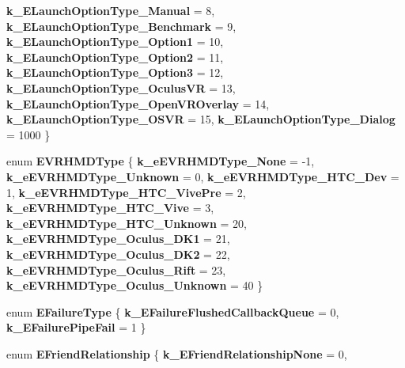 \begin{DoxyCompactItemize}
{\bfseries k\+\_\+\+E\+Launch\+Option\+Type\+\_\+\+Manual} = 8, 
{\bfseries k\+\_\+\+E\+Launch\+Option\+Type\+\_\+\+Benchmark} = 9, 
{\bfseries k\+\_\+\+E\+Launch\+Option\+Type\+\_\+\+Option1} = 10, 
{\bfseries k\+\_\+\+E\+Launch\+Option\+Type\+\_\+\+Option2} = 11, 
\newline
{\bfseries k\+\_\+\+E\+Launch\+Option\+Type\+\_\+\+Option3} = 12, 
{\bfseries k\+\_\+\+E\+Launch\+Option\+Type\+\_\+\+Oculus\+VR} = 13, 
{\bfseries k\+\_\+\+E\+Launch\+Option\+Type\+\_\+\+Open\+V\+R\+Overlay} = 14, 
{\bfseries k\+\_\+\+E\+Launch\+Option\+Type\+\_\+\+O\+S\+VR} = 15, 
\newline
{\bfseries k\+\_\+\+E\+Launch\+Option\+Type\+\_\+\+Dialog} = 1000
 \}
\item 
\mbox{\label{namespace_valve_1_1_steamworks_a1f9a9f91a372f79a1b570bd88f2b4a7a}} 
enum {\bfseries E\+V\+R\+H\+M\+D\+Type} \{ \newline
{\bfseries k\+\_\+e\+E\+V\+R\+H\+M\+D\+Type\+\_\+\+None} = -\/1, 
{\bfseries k\+\_\+e\+E\+V\+R\+H\+M\+D\+Type\+\_\+\+Unknown} = 0, 
{\bfseries k\+\_\+e\+E\+V\+R\+H\+M\+D\+Type\+\_\+\+H\+T\+C\+\_\+\+Dev} = 1, 
{\bfseries k\+\_\+e\+E\+V\+R\+H\+M\+D\+Type\+\_\+\+H\+T\+C\+\_\+\+Vive\+Pre} = 2, 
\newline
{\bfseries k\+\_\+e\+E\+V\+R\+H\+M\+D\+Type\+\_\+\+H\+T\+C\+\_\+\+Vive} = 3, 
{\bfseries k\+\_\+e\+E\+V\+R\+H\+M\+D\+Type\+\_\+\+H\+T\+C\+\_\+\+Unknown} = 20, 
{\bfseries k\+\_\+e\+E\+V\+R\+H\+M\+D\+Type\+\_\+\+Oculus\+\_\+\+D\+K1} = 21, 
{\bfseries k\+\_\+e\+E\+V\+R\+H\+M\+D\+Type\+\_\+\+Oculus\+\_\+\+D\+K2} = 22, 
\newline
{\bfseries k\+\_\+e\+E\+V\+R\+H\+M\+D\+Type\+\_\+\+Oculus\+\_\+\+Rift} = 23, 
{\bfseries k\+\_\+e\+E\+V\+R\+H\+M\+D\+Type\+\_\+\+Oculus\+\_\+\+Unknown} = 40
 \}
\item 
\mbox{\label{namespace_valve_1_1_steamworks_a9db940d62bb6c76642cee158252002da}} 
enum {\bfseries E\+Failure\+Type} \{ {\bfseries k\+\_\+\+E\+Failure\+Flushed\+Callback\+Queue} = 0, 
{\bfseries k\+\_\+\+E\+Failure\+Pipe\+Fail} = 1
 \}
\item 
\mbox{\label{namespace_valve_1_1_steamworks_a8b7e0e82023fd49d8a424ffac0de57cf}} 
enum {\bfseries E\+Friend\+Relationship} \{ \newline
{\bfseries k\+\_\+\+E\+Friend\+Relationship\+None} = 0, 

\end{DoxyCompactItemize}
